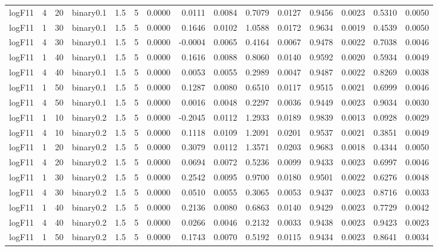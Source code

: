 \begin{longtable}{rrrrrrrrrrrrrrr}
  logF11 & 4 & 20 & binary0.1 & 1.5 & 5 & 0.0000 & 0.0111 & 0.0084 & 0.7079 & 0.0127 & 0.9456 & 0.0023 & 0.5310 & 0.0050 \\ 
  logF11 & 1 & 30 & binary0.1 & 1.5 & 5 & 0.0000 & 0.1646 & 0.0102 & 1.0588 & 0.0172 & 0.9634 & 0.0019 & 0.4539 & 0.0050 \\ 
  logF11 & 4 & 30 & binary0.1 & 1.5 & 5 & 0.0000 & -0.0004 & 0.0065 & 0.4164 & 0.0067 & 0.9478 & 0.0022 & 0.7038 & 0.0046 \\ 
  logF11 & 1 & 40 & binary0.1 & 1.5 & 5 & 0.0000 & 0.1616 & 0.0088 & 0.8060 & 0.0140 & 0.9592 & 0.0020 & 0.5934 & 0.0049 \\ 
  logF11 & 4 & 40 & binary0.1 & 1.5 & 5 & 0.0000 & 0.0053 & 0.0055 & 0.2989 & 0.0047 & 0.9487 & 0.0022 & 0.8269 & 0.0038 \\ 
  logF11 & 1 & 50 & binary0.1 & 1.5 & 5 & 0.0000 & 0.1287 & 0.0080 & 0.6510 & 0.0117 & 0.9515 & 0.0021 & 0.6999 & 0.0046 \\ 
  logF11 & 4 & 50 & binary0.1 & 1.5 & 5 & 0.0000 & 0.0016 & 0.0048 & 0.2297 & 0.0036 & 0.9449 & 0.0023 & 0.9034 & 0.0030 \\ 
  logF11 & 1 & 10 & binary0.2 & 1.5 & 5 & 0.0000 & -0.2045 & 0.0112 & 1.2933 & 0.0189 & 0.9839 & 0.0013 & 0.0928 & 0.0029 \\ 
  logF11 & 4 & 10 & binary0.2 & 1.5 & 5 & 0.0000 & 0.1118 & 0.0109 & 1.2091 & 0.0201 & 0.9537 & 0.0021 & 0.3851 & 0.0049 \\ 
  logF11 & 1 & 20 & binary0.2 & 1.5 & 5 & 0.0000 & 0.3079 & 0.0112 & 1.3571 & 0.0203 & 0.9683 & 0.0018 & 0.4344 & 0.0050 \\ 
  logF11 & 4 & 20 & binary0.2 & 1.5 & 5 & 0.0000 & 0.0694 & 0.0072 & 0.5236 & 0.0099 & 0.9433 & 0.0023 & 0.6997 & 0.0046 \\ 
  logF11 & 1 & 30 & binary0.2 & 1.5 & 5 & 0.0000 & 0.2542 & 0.0095 & 0.9700 & 0.0180 & 0.9501 & 0.0022 & 0.6276 & 0.0048 \\ 
  logF11 & 4 & 30 & binary0.2 & 1.5 & 5 & 0.0000 & 0.0510 & 0.0055 & 0.3065 & 0.0053 & 0.9437 & 0.0023 & 0.8716 & 0.0033 \\ 
  logF11 & 1 & 40 & binary0.2 & 1.5 & 5 & 0.0000 & 0.2136 & 0.0080 & 0.6863 & 0.0140 & 0.9429 & 0.0023 & 0.7729 & 0.0042 \\ 
  logF11 & 4 & 40 & binary0.2 & 1.5 & 5 & 0.0000 & 0.0266 & 0.0046 & 0.2132 & 0.0033 & 0.9438 & 0.0023 & 0.9423 & 0.0023 \\ 
  logF11 & 1 & 50 & binary0.2 & 1.5 & 5 & 0.0000 & 0.1743 & 0.0070 & 0.5192 & 0.0115 & 0.9434 & 0.0023 & 0.8641 & 0.0034 \\ 

\end{longtable}
